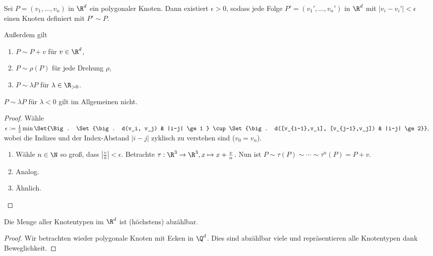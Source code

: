 \begin{st}
    Sei $P = (v_1, \dotsc, v_n)$ in $\R^d$ ein polygonaler Knoten.
    Dann existiert $\epsilon > 0$, sodass jede Folge $P' = (v_1', \dotsc, v_n')$ in $\R^d$ mit $|v_i - v_i'| < \epsilon$ einen Knoten definiert mit $P' \sim P$.

    Außerdem gilt
    \begin{enumerate}[(1)]
        \item
            $P \sim P + v$ für $v \in \R^d$,
        \item
            $P \sim \rho(P)$ für jede Drehung $\rho$,
        \item
            $P \sim \lambda P$ für $\lambda \in \R_{>0}$.
    \end{enumerate}
    \begin{note}
        $P \sim \lambda P$ für $\lambda < 0$ gilt im Allgemeinen nicht.
    \end{note}
    \begin{proof}
        Wähle
        \begin{math}
            \epsilon := \frac{1}{2} \min \Set{\Big. \Set{\big. d(v_i, v_j) & |i-j| \ge 1 } \cup \Set{\big. d([v_{i-1},v_i], [v_{j-1},v_j]) & |i-j| \ge 2}},
        \end{math}
        wobei die Indizes und der Index-Abstand $|i-j|$ zyklisch zu verstehen sind ($v_0 = v_n$).
        \begin{enumerate}[(1)]
            \item
                Wähle $n \in \N$ so groß, dass $|\frac{v}{n}| < \epsilon$.
                Betrachte $\tau: \R^3 \to \R^3, x \mapsto x + \frac{v}{n}$.
                Nun ist $P \sim \tau(P) \sim \dotsb \sim \tau^n(P) = P + v$.
            \item
                Analog.
            \item
                Ähnlich.
        \end{enumerate}
    \end{proof}
\end{st}


\begin{kor}
    Die Menge aller Knotentypen im $\R^d$ ist (höchstens) abzählbar.
    \begin{proof}
        Wir betrachten wieder polygonale Knoten mit Ecken in $\Q^d$.
        Dies sind abzählbar viele und repräsentieren alle Knotentypen dank Beweglichkeit.
    \end{proof}
\end{kor}

